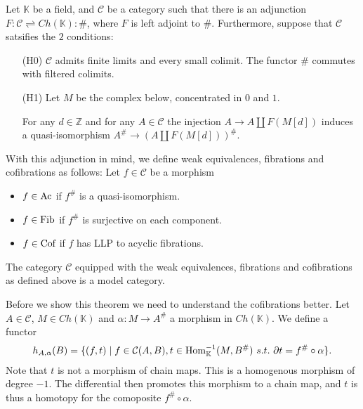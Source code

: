 \documentclass[../thesis.tex]{subfiles}
\begin{document}
            Let $\mathbb{K}$ be a field, and $\mathcal{C}$ be a category such that there is an adjunction $F:\mathcal{C}\rightleftharpoons Ch(\mathbb{K}):\#$, where $F$ is left adjoint to $\#$. Furthermore, suppose that $\mathcal{C}$ satsifies the $2$ conditions:
            \begin{itemize}
                \item[(H0)] $\mathcal{C}$ admits finite limits and every small colimit. The functor $\#$ commutes with filtered colimits.
                \item[(H1)] Let $M$ be the complex below, concentrated in $0$ and $1$.
                \begin{center}
                \end{center}
                For any $d\in \mathbb{Z}$ and for any $A\in\mathcal{C}$ the injection $A \rightarrow A \coprod F(M[d])$ induces a quasi-isomorphism $A^\# \rightarrow (A\coprod F(M[d]))^\#$.
            \end{itemize}
                
            With this adjunction in mind, we define weak equivalences, fibrations and cofibrations as follows:
            Let $f\in \mathcal{C}$ be a morphism
            \begin{itemize}
                \item $f\in \tt{Ac}$ if $f^\#$ is a quasi-isomorphism.
                \item $f\in \tt{Fib}$ if $f^\#$ is surjective on each component.
                \item $f\in \tt{Cof}$ if $f$ has LLP to acyclic fibrations.
            \end{itemize}

            \begin{thm}\label{thm: model-str-alg}
                The category $\mathcal{C}$ equipped with the weak equivalences, fibrations and cofibrations as defined above is a model category.
            \end{thm}

            Before we show this theorem we need to understand the cofibrations better. Let $A\in\mathcal{C}$, $M\in Ch(\mathbb{K})$ and $\alpha : M \rightarrow A^\#$ a morphism in $Ch(\mathbb{K})$. We define a functor 
            \begin{align*}
                h_{A,\alpha}(B) = \startset{(f,t)\mid f\in \mathcal{C}(A,B), t\in \tt{Hom}^{-1}_\mathbb{K}(M, B^\#)\ s.t.\ \partial t = f^\#\circ\alpha}.
            \end{align*}
            Note that $t$ is not a morphism of chain maps. This is a homogenous morphism of degree $-1$. The differential then promotes this morphism to a chain map, and $t$ is thus a homotopy for the comoposite $f^\#\circ\alpha$.
\end{document}
